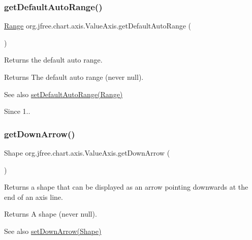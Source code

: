 \subsubsection{\texorpdfstring{get\+Default\+Auto\+Range()}{getDefaultAutoRange()}}
{\footnotesize\ttfamily \mbox{\hyperlink{classorg_1_1jfree_1_1data_1_1_range}{Range}} org.\+jfree.\+chart.\+axis.\+Value\+Axis.\+get\+Default\+Auto\+Range (\begin{DoxyParamCaption}{ }\end{DoxyParamCaption})}

Returns the default auto range.

\begin{DoxyReturn}{Returns}
The default auto range (never {\ttfamily null}).
\end{DoxyReturn}
\begin{DoxySeeAlso}{See also}
\mbox{\hyperlink{classorg_1_1jfree_1_1chart_1_1axis_1_1_value_axis_aa226504260af86620b2adac63cf2a7c8}{set\+Default\+Auto\+Range(\+Range)}}
\end{DoxySeeAlso}
\begin{DoxySince}{Since}
1.. 
\end{DoxySince}
\mbox{\label{classorg_1_1jfree_1_1chart_1_1axis_1_1_value_axis_a202802c63b8054742b83b462f2e467c7}} 
\subsubsection{\texorpdfstring{get\+Down\+Arrow()}{getDownArrow()}}
{\footnotesize\ttfamily Shape org.\+jfree.\+chart.\+axis.\+Value\+Axis.\+get\+Down\+Arrow (\begin{DoxyParamCaption}{ }\end{DoxyParamCaption})}

Returns a shape that can be displayed as an arrow pointing downwards at the end of an axis line.

\begin{DoxyReturn}{Returns}
A shape (never {\ttfamily null}).
\end{DoxyReturn}
\begin{DoxySeeAlso}{See also}
\mbox{\hyperlink{classorg_1_1jfree_1_1chart_1_1axis_1_1_value_axis_a299e89865d4a95a60518445de0807b34}{set\+Down\+Arrow(\+Shape)}} 
\end{DoxySeeAlso}
\mbox{\label{classorg_1_1jfree_1_1chart_1_1axis_1_1_value_axis_a6b0e72b7c1c1964aff3ac2a854820fb7}} 
